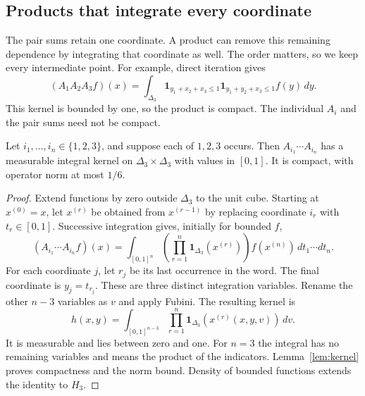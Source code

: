 \documentclass[11pt]{article}
\newcommand{\D}{\Delta}
\begin{document}
\subsection{Products that integrate every coordinate}

The pair sums retain one coordinate.
A product can remove this remaining dependence by integrating that
coordinate as well.  The order matters, so we keep every intermediate point.
For example, direct iteration gives
\[
 (A_1A_2A_3f)(x)
 =\int_{\D_3}
    \mathbf1_{y_1+x_2+x_3\leq1}
    \mathbf1_{y_1+y_2+x_3\leq1}f(y)\,dy.
\]
This kernel is bounded by one, so the product is compact.
The individual $A_i$ and the pair sums need not be compact.

\begin{lemma}\label{lem:words}
Let $i_1,\ldots,i_n\in\{1,2,3\}$, and suppose each of $1,2,3$
occurs.  Then $A_{i_1}\cdots A_{i_n}$ has a measurable integral kernel
on $\D_3\times\D_3$ with values in $[0,1]$.
It is compact, with operator norm at most $1/6$.
\end{lemma}

\begin{proof}
Extend functions by zero outside $\D_3$ to the unit cube.
Starting at $x^{(0)}=x$, let $x^{(r)}$ be obtained from $x^{(r-1)}$
by replacing coordinate $i_r$ with $t_r\in[0,1]$.
Successive integration gives, initially for bounded $f$,
\[
 (A_{i_1}\cdots A_{i_n}f)(x)
 =\int_{[0,1]^n}
      \left(\prod_{r=1}^n\mathbf1_{\D_3}(x^{(r)})\right)
                          f(x^{(n)})\,dt_1\cdots dt_n.
\]
For each coordinate $j$, let $r_j$ be its last occurrence in the word.
The final coordinate is $y_j=t_{r_j}$.
These are three distinct integration variables.
Rename the other $n-3$ variables as $v$ and apply Fubini.
The resulting kernel is
\[
 h(x,y)=\int_{[0,1]^{n-3}}
                \prod_{r=1}^n\mathbf1_{\D_3}(x^{(r)}(x,y,v))\,dv.
\]
It is measurable and lies between zero and one.
For $n=3$ the integral has no remaining variables and means the product
of the indicators.  Lemma~\ref{lem:kernel} proves compactness and the norm
bound.  Density of bounded functions extends the identity to $H_3$.
\end{proof}
\end{document}
